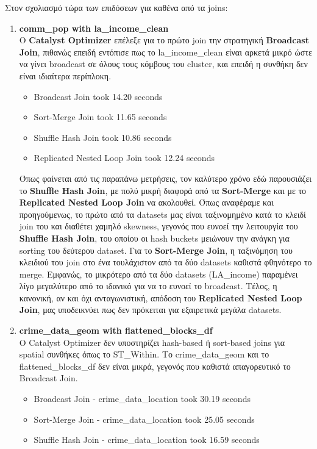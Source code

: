 \documentclass{article}
\begin{document}
Στον σχολιασμό τώρα των επιδόσεων για καθένα από τα joins:
\begin{enumerate}
	\item \textbf{comm\_pop with la\_income\_clean}\\
	Ο \textbf{Catalyst Optimizer} επέλεξε για το πρώτο join την στρατηγική \textbf{Broadcast Join}, πιθανώς επειδή εντόπισε πως το la\_income\_clean είναι αρκετά μικρό ώστε να γίνει broadcast σε όλους τους κόμβους του cluster, και επειδή η συνθήκη δεν είναι ιδιαίτερα περίπλοκη.
	\begin{itemize}
		\item Broadcast Join took 14.20 seconds 
		\item Sort-Merge Join took 11.65 seconds 
		\item Shuffle Hash Join took 10.86 seconds	
		\item Replicated Nested Loop Join took 12.24 seconds 	
	\end{itemize}	
 Όπως φαίνεται από τις παραπάνω μετρήσεις, τον καλύτερο χρόνο εδώ παρουσιάζει το \textbf{Shuffle Hash Join}, με πολύ μικρή διαφορά από τα \textbf{Sort-Merge} και με το \textbf{Replicated Nested Loop Join} να ακολουθεί. Όπως αναφέραμε και προηγούμενως, το πρώτο από τα datasets μας είναι ταξινομημένο κατά το κλειδί join του και διαθέτει χαμηλό skewness, γεγονός που ευνοεί την λειτουργία του \textbf{Shuffle Hash Join}, του οποίου οι hash buckets μειώνουν την ανάγκη για sorting του δεύτερου dataset. Για το \textbf{Sort-Merge Join}, η ταξινόμηση του κλειδιού του join στο ένα τουλάχιστον από τα δύο datasets καθιστά φθηνότερο το merge. Εμφανώς, το μικρότερο από τα δύο datasets (LA\_income) παραμένει λίγο μεγαλύτερο από το ιδανικό για να το ευνοεί το broadcast. Τέλος, η κανονική, αν και όχι ανταγωνιστική, απόδοση του \textbf{Replicated Nested Loop Join}, μας υποδεικνύει πως δεν πρόκειται για εξαιρετικά μεγάλα datasets. 
\item \textbf{crime\_data\_geom with flattened\_blocks\_df} \\
Ο Catalyst Optimizer δεν υποστηρίζει hash-based ή sort-based joins για spatial συνθήκες όπως το ST\_Within.
Το crime\_data\_geom και το flattened\_blocks\_df δεν είναι μικρά, γεγονός που καθιστά απαγορευτικό το Broadcast Join.
	\begin{itemize}
		\item Broadcast Join - crime\_data\_location took 30.19 seconds 
		\item Sort-Merge Join - crime\_data\_location took 25.05 seconds
		\item Shuffle Hash Join - crime\_data\_location took 16.59 seconds

\end{itemize}
\end{enumerate}
\end{document}
